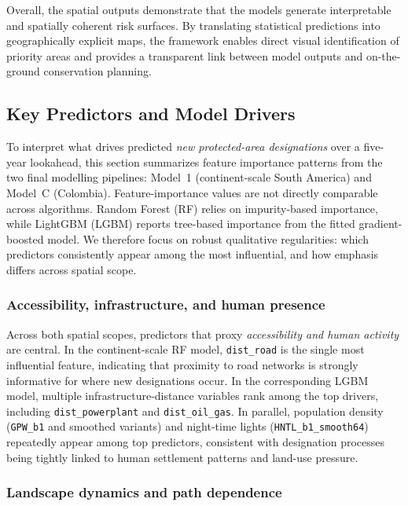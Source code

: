 \documentclass[12pt]{article}
\theoremstyle{break} %
\begin{document}
Overall, the spatial outputs demonstrate that the models generate interpretable and spatially coherent risk surfaces. By translating statistical predictions into geographically explicit maps, the framework enables direct visual identification of priority areas and provides a transparent link between model outputs and on-the-ground conservation planning.

\subsection{Key Predictors and Model Drivers}
\label{results:drivers}

To interpret what drives predicted \emph{new protected-area designations} over a five-year lookahead, this section summarizes feature importance patterns from the two final modelling pipelines: Model~1 (continent-scale South America) and Model~C (Colombia). Feature-importance values are not directly comparable across algorithms. Random Forest (RF) relies on impurity-based importance, while LightGBM (LGBM) reports tree-based importance from the fitted gradient-boosted model. We therefore focus on robust qualitative regularities: which predictors consistently appear among the most influential, and how emphasis differs across spatial scope.

\subsubsection*{Accessibility, infrastructure, and human presence}

Across both spatial scopes, predictors that proxy \emph{accessibility and human activity} are central. In the continent-scale RF model, \texttt{dist\_road} is the single most influential feature, indicating that proximity to road networks is strongly informative for where new designations occur. In the corresponding LGBM model, multiple infrastructure-distance variables rank among the top drivers, including \texttt{dist\_powerplant} and \texttt{dist\_oil\_gas}. In parallel, population density (\texttt{GPW\_b1} and smoothed variants) and night-time lights (\texttt{HNTL\_b1\_smooth64}) repeatedly appear among top predictors, consistent with designation processes being tightly linked to human settlement patterns and land-use pressure.

\subsubsection*{Landscape dynamics and path dependence}
\end{document}
